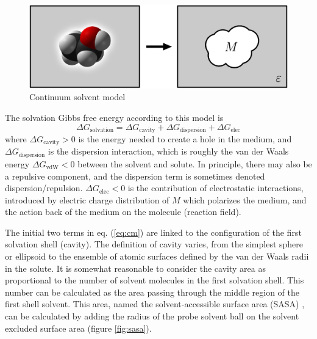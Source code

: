 \begin{figure}[h]
\begin{centering}
\includegraphics[width=0.72\columnwidth]{_figure/reaction-field-model_2}
\par\end{centering}
\caption{Continuum solvent model\label{fig:Reaction-field-model}}
\end{figure}

The solvation Gibbs free energy according to this model is
\begin{equation}
\Delta G_{\mathrm{solvation}}=\Delta G_{\mathrm{cavity}}+\Delta G_{\mathrm{dispersion}}+\Delta G_{\mathrm{elec}}\label{eq:cm}
\end{equation}
where $\Delta G_{\mathrm{cavity}}>0$ is the energy needed to create
a hole in the medium, and $\Delta G_{\mathrm{dispersion}}$ is the
dispersion interaction, which is roughly the van der Waals energy
$\Delta G_{\mathrm{vdW}}<0$ between the solvent and solute. In principle,
there may also be a repulsive component, and the dispersion term is
sometimes denoted dispersion/repulsion. $\Delta G_{\mathrm{elec}}<0$
is the contribution of electrostatic interactions, introduced by electric
charge distribution of $M$ which polarizes the medium, and the action
back of the medium on the molecule (reaction field). 

The initial two terms in eq. (\ref{eq:cm}) are linked to the configuration
of the first solvation shell (cavity). The definition of cavity varies,
from the simplest sphere or ellipsoid to the ensemble of atomic surfaces
defined by the van der Waals radii in the solute. It is somewhat reasonable
to consider the cavity area as proportional to the number of solvent
molecules in the first solvation shell. This number can be calculated
as the area passing through the middle region of the first shell solvent.
This area, named the solvent-accessible surface area (SASA) \citep{SAS_1,SAS_2},
can be calculated by adding the radius of the probe solvent ball on
the solvent excluded surface area (figure \ref{fig:sasa}).

